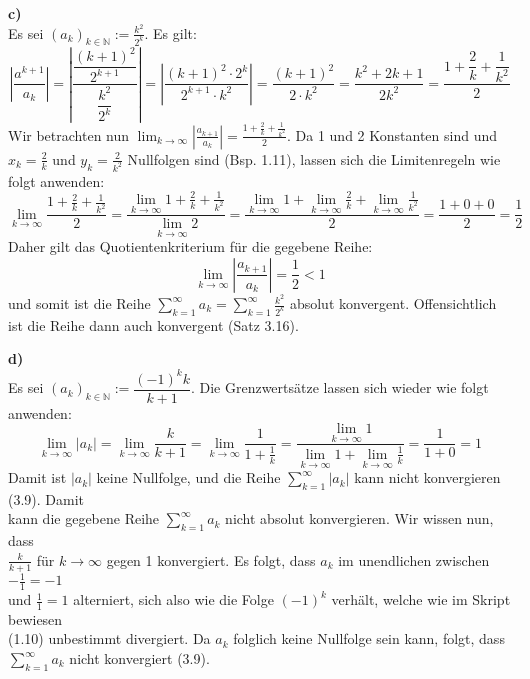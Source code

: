 \documentclass[a4paper,graphics,11pt]{article}
\begin{document}
\textbf{c)}\\[5pt]
Es sei $\displaystyle(a_k)_{k \in \mathbb{N}} := \frac{k^2}{2^k}$. Es gilt:
$$
    \left|\frac{a^{k+1}}{a_k}\right|
    = \left|\frac{\dfrac{(k+1)^2}{2^{k+1}}}{{\dfrac{k^2}{2^k}}}\right|
    = \left|\frac{(k+1)^2 \cdot 2^k}{2^{k+1}\cdot k^2}\right|
    = \frac{(k+1)^2}{2\cdot k^2}
    = \frac{k^2+2k+1}{2k^2}
    = \frac{1+\dfrac{2}{k}+\dfrac{1}{k^2}}{2}
$$
Wir betrachten nun $\displaystyle\lim_{k \to \infty}\limits \left|\frac{a_{k+1}}{a_k}\right|
= \frac{1+\frac{2}{k}+\frac{1}{k^2}}{2}$. Da 1 und 2 Konstanten sind und
$x_k=\frac{2}{k}$ und $y_k=\frac{2}{k^2}$ Nullfolgen sind (Bsp. 1.11), lassen sich
die Limitenregeln wie folgt anwenden:
$$
    \lim_{k \to \infty} \frac{1+\frac{2}{k}+\frac{1}{k^2}}{2}
    = \frac{\lim_{k\to\infty}\limits1+\frac{2}{k}+\frac{1}{k^2}}{\lim_{k \to \infty}\limits 2}
    = \frac{\lim_{k \to \infty}\limits 1 + \lim_{k \to \infty}\limits \frac{2}{k}+ \lim_{k \to \infty}\limits \frac{1}{k^2}}{2}
    = \frac{1+0+0}{2} = \frac{1}{2}
$$
Daher gilt das Quotientenkriterium für die gegebene Reihe:
$$
    \lim_{k \to \infty} \left|\frac{a_{k+1}}{a_k}\right| = \frac{1}{2} < 1
$$
und somit ist die Reihe $\displaystyle\sum_{k=1}^{\infty} a_k = \sum_{k=1}^{\infty} \frac{k^2}{2^k}$
absolut konvergent. Offensichtlich ist die Reihe dann auch konvergent (Satz 3.16).

\textbf{d)}\\[5pt]
Es sei $(a_k)_{k\in \mathbb{N}} := \dfrac{(-1)^kk}{k+1}$. Die Grenzwertsätze lassen sich
wieder wie folgt anwenden:
$$
    \displaystyle\lim_{k \to \infty} |a_k|
    = \lim_{k \to \infty} \frac{k}{k+1}
    = \lim_{k \to \infty} \frac{1}{1+\frac{1}{k}}
    = \frac{\lim_{k \to \infty}\limits 1}{\lim_{k \to \infty}\limits 1 + \lim_{k \to \infty}\limits \frac{1}{k}}
    = \frac{1}{1+0}
    = 1
$$
Damit ist $|a_k|$ keine Nullfolge, und die Reihe $\sum_{k=1}^{\infty} |a_k|$ kann nicht
konvergieren (3.9). Damit\\[2pt]
kann die gegebene Reihe $\sum_{k=1}^{\infty} a_k$ nicht absolut konvergieren.
Wir wissen nun, dass\\[2pt]
$\frac{k}{k+1}$ für $k\to \infty$ gegen 1 konvergiert. Es folgt,
dass $a_k$ im unendlichen zwischen $-\frac{1}{1} = -1$\\[2pt]
und $\frac{1}{1} = 1$ alterniert, sich also wie die Folge $(-1)^k$ verhält, welche
wie im Skript bewiesen\\[2pt]
(1.10) unbestimmt divergiert. Da $a_k$ folglich keine Nullfolge sein
kann, folgt, dass $\sum_{k=1}^{\infty} a_k$ nicht konvergiert (3.9).
\end{document}
